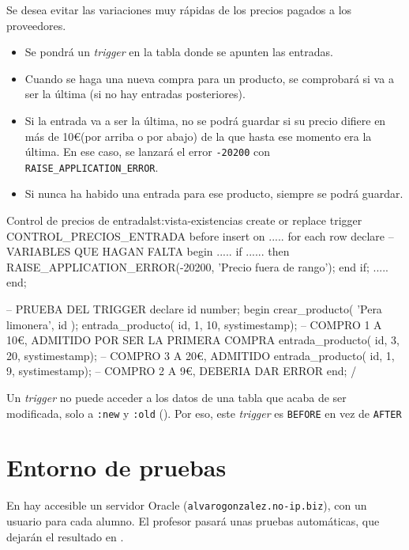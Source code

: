 \begin{homeworkProblem}

  Se desea evitar las variaciones muy rápidas de los precios pagados a los proveedores.
  \begin{itemize}
  \item Se pondrá un \textit{trigger} en la tabla donde se apunten las entradas.
  \item Cuando se haga una nueva compra para un producto, se comprobará si va a ser la última (si no hay entradas posteriores).
  \item Si la entrada va a ser la última, no se podrá guardar si su precio difiere en más de 10\euro (por arriba o por abajo) de la que hasta ese momento era la última. En ese caso, se lanzará el error \texttt{-20200} con \texttt{RAISE\_APPLICATION\_ERROR}.
  \item Si nunca ha habido una entrada para ese producto, siempre se podrá guardar.
  \end{itemize}

\begin{listadosql}{Control de precios de entrada}{lst:vista-existencias}
create or replace trigger CONTROL_PRECIOS_ENTRADA
before insert on .....
for each row 
declare
-- VARIABLES QUE HAGAN FALTA
begin
.....
if ...... then
RAISE_APPLICATION_ERROR(-20200, 'Precio fuera de rango');
end if;
.....
end;

-- PRUEBA DEL TRIGGER
declare
id number;
begin
crear_producto( 'Pera limonera', id );
entrada_producto( id, 1, 10, systimestamp); -- COMPRO 1 A 10€, ADMITIDO POR SER LA PRIMERA COMPRA
entrada_producto( id, 3, 20, systimestamp); -- COMPRO 3 A 20€, ADMITIDO
entrada_producto( id, 1, 9, systimestamp); -- COMPRO 2 A 9€, DEBERIA DAR ERROR
end;
/
\end{listadosql}  

  \begin{Aviso}
    Un \textit{trigger} no puede acceder a los datos de una tabla que acaba de ser modificada, solo a \texttt{:new} y \texttt{:old} (). Por eso, este \textit{trigger} es \texttt{BEFORE} en vez de \texttt{AFTER}
  \end{Aviso}


\end{homeworkProblem}


\section{Entorno de pruebas}
En hay accesible un servidor Oracle (\texttt{alvarogonzalez.no-ip.biz}), con un usuario para cada alumno.
El profesor pasará unas pruebas automáticas, que dejarán el resultado en .


